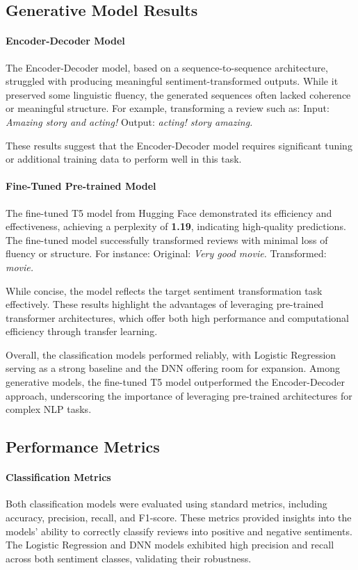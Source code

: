 \documentclass{article}
\begin{document}
\subsection{Generative Model Results}

\paragraph{Encoder-Decoder Model}
The Encoder-Decoder model, based on a sequence-to-sequence architecture, struggled with producing meaningful sentiment-transformed outputs. While it preserved some linguistic fluency, the generated sequences often lacked coherence or meaningful structure. For example, transforming a review such as:
Input: \textit{Amazing story and acting!}
Output: \textit{acting! story amazing.}

These results suggest that the Encoder-Decoder model requires significant tuning or additional training data to perform well in this task.

\paragraph{Fine-Tuned Pre-trained Model}
The fine-tuned T5 model from Hugging Face demonstrated its efficiency and effectiveness, achieving a perplexity of \textbf{1.19}, indicating high-quality predictions. The fine-tuned model successfully transformed reviews with minimal loss of fluency or structure. For instance:
Original: \textit{Very good movie.}
Transformed: \textit{movie.}

While concise, the model reflects the target sentiment transformation task effectively. These results highlight the advantages of leveraging pre-trained transformer architectures, which offer both high performance and computational efficiency through transfer learning.

Overall, the classification models performed reliably, with Logistic Regression serving as a strong baseline and the DNN offering room for expansion. Among generative models, the fine-tuned T5 model outperformed the Encoder-Decoder approach, underscoring the importance of leveraging pre-trained architectures for complex NLP tasks.

\subsection{Performance Metrics}
\paragraph{Classification Metrics}
Both classification models were evaluated using standard metrics, including accuracy, precision, recall, and F1-score. These metrics provided insights into the models' ability to correctly classify reviews into positive and negative sentiments. The Logistic Regression and DNN models exhibited high precision and recall across both sentiment classes, validating their robustness.
\end{document}
